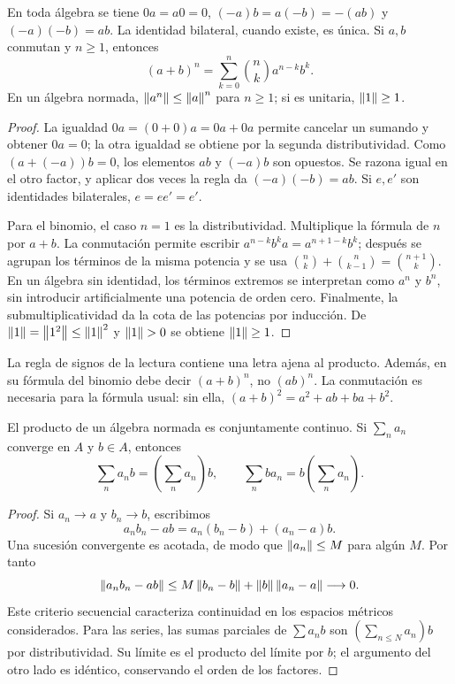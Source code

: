\begin{proposicion}\label{v3:algebra-identidades}
En toda álgebra se tiene $0a=a0=0$, $(-a)b=a(-b)=-(ab)$ y $(-a)(-b)=ab$. La identidad bilateral, cuando existe, es única. Si $a,b$ conmutan y $n\geq1$, entonces
\[
 (a+b)^n=\sum_{k=0}^n\binom nk a^{n-k}b^k.
\]
En un álgebra normada, $\left\lVert a^n\right\rVert\leq\left\lVert a\right\rVert^n$ para $n\geq1$; si es unitaria, $\left\lVert1\right\rVert\geq1$.
\end{proposicion}
\begin{proof}
La igualdad $0a=(0+0)a=0a+0a$ permite cancelar un sumando y obtener $0a=0$; la otra igualdad se obtiene por la segunda distributividad. Como $(a+(-a))b=0$, los elementos $ab$ y $(-a)b$ son opuestos. Se razona igual en el otro factor, y aplicar dos veces la regla da $(-a)(-b)=ab$. Si $e,e'$ son identidades bilaterales, $e=ee'=e'$.

Para el binomio, el caso $n=1$ es la distributividad. Multiplique la fórmula de $n$ por $a+b$. La conmutación permite escribir $a^{n-k}b^ka=a^{n+1-k}b^k$; después se agrupan los términos de la misma potencia y se usa $\binom nk+\binom n{k-1}=\binom{n+1}k$. En un álgebra sin identidad, los términos extremos se interpretan como $a^n$ y $b^n$, sin introducir artificialmente una potencia de orden cero. Finalmente, la submultiplicatividad da la cota de las potencias por inducción. De $\left\lVert1\right\rVert=\left\lVert1^2\right\rVert\leq\left\lVert1\right\rVert^2$ y $\left\lVert1\right\rVert>0$ se obtiene $\left\lVert1\right\rVert\geq1$.
\end{proof}

\begin{observacion}
La regla de signos de la lectura contiene una letra ajena al producto. Además, en su fórmula del binomio debe decir $(a+b)^n$, no $(ab)^n$. La conmutación es necesaria para la fórmula usual: sin ella, $(a+b)^2=a^2+ab+ba+b^2$.
\end{observacion}

\begin{proposicion}\label{v3:producto-continuo}
El producto de un álgebra normada es conjuntamente continuo. Si $\sum_n a_n$ converge en $A$ y $b\in A$, entonces
\[
 \sum_n a_nb=\left(\sum_n a_n\right)b,
 \qquad \sum_n ba_n=b\left(\sum_n a_n\right).
\]
\end{proposicion}
\begin{proof}
Si $a_n\to a$ y $b_n\to b$, escribimos
\[
 a_nb_n-ab=a_n(b_n-b)+(a_n-a)b.
\]
Una sucesión convergente es acotada, de modo que $\left\lVert a_n\right\rVert\leq M$ para algún $M$. Por tanto
\[
 \left\lVert a_nb_n-ab\right\rVert\leq M\left\lVert b_n-b\right\rVert+\left\lVert b\right\rVert\left\lVert a_n-a\right\rVert\longrightarrow0.
\]
Este criterio secuencial caracteriza continuidad en los espacios métricos considerados. Para las series, las sumas parciales de $\sum a_nb$ son $(\sum_{n\leq N}a_n)b$ por distributividad. Su límite es el producto del límite por $b$; el argumento del otro lado es idéntico, conservando el orden de los factores.
\end{proof}

